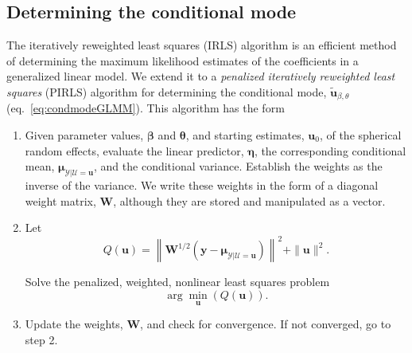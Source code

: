 \documentclass{article}
\newcommand{\mc}[1]{\ensuremath{\mathcal{#1}}}
\begin{document}
\subsection{Determining the conditional mode}
\label{sec:conditionalMode}

The iteratively reweighted least squares (IRLS) algorithm is an
efficient method of determining the maximum likelihood
estimates of the coefficients in a generalized linear model.
We extend it to a \emph{penalized iteratively reweighted least squares}
(PIRLS) algorithm for determining the conditional mode, $\tilde{\bm u}_{\beta,\theta}$
(eq.~\ref{eq:condmodeGLMM}).
This algorithm has the form
\begin{enumerate}
\item Given parameter values, $\bm\beta$ and $\bm\theta$, and starting
  estimates, $\bm u_0$, of the spherical random effects, evaluate the linear predictor, $\bm\eta$, the
  corresponding conditional mean, $\bm\mu_{\mc Y|\mc U=\bm u}$, and
  the conditional variance.
  Establish the weights as the inverse of the variance.
  We write these weights in the form of a diagonal weight matrix, $\bm W$, although they are stored and manipulated as a vector.
\item Let 
  \begin{equation}
  Q(\bm u) = \left\|\bm W^{1/2}\left(\bm y-\bm\mu_{\mc
    Y|\mc U=\bm u}\right)\right\|^2+\|\bm u\|^2.
  \end{equation}

  Solve the penalized, weighted, nonlinear least squares problem
  \begin{equation}
    \label{eq:weightedNLS}
    \arg\min_{\bm u}\left( Q(\bm u) \right).
  \end{equation}
\item Update the weights, $\bm W$, and check for convergence.  If not
  converged, go to step 2.
\end{enumerate}
\end{document}
